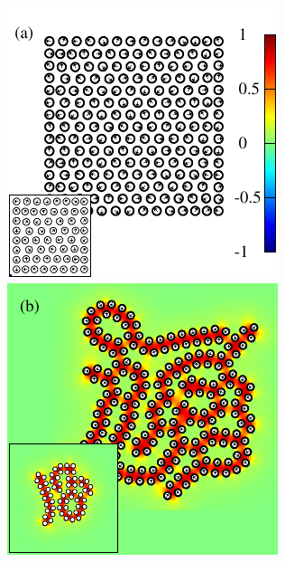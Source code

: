 \documentclass[prb,preprint,showpacs,preprintnumbers,amsmath,amssymb,longbibliography]{revtex4-1}
\renewcommand{\aa}{\mathbf{a}}
\renewcommand{\vv}{\mathbf{v}}
\begin{document}

\begin{figure}[h!]
\begin{center}
  \includegraphics[height=0.3\textheight]{Nb198a_inset.pdf}
  \includegraphics[height=0.3\textheight]{Nb198b_eta_inset.pdf}\\

\end{center}
\end{figure}
\end{document}
